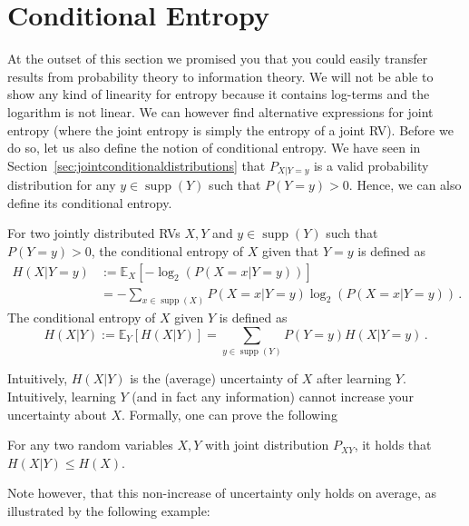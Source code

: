 \documentclass[11pt,leqno,a4paper]{report}\usepackage[]{graphicx}\usepackage[]{color}
\newcommand{\supp}{\operatorname{supp}}
\newcommand{\E}{\mathbb{E}}
\begin{document}
\section{Conditional Entropy}
At the outset of this section we promised you that you could easily transfer results from probability 
theory to information theory. We will not be able to show any kind of linearity for entropy because it contains
log-terms and the logarithm is not linear. We can however find alternative expressions for joint entropy (where 
the joint entropy is simply the entropy of a joint RV). Before we do so, let us also define the notion of 
conditional entropy. We have seen in Section~\ref{sec:jointconditionaldistributions} that $P_{X|Y=y}$ is a valid probability distribution for any $y \in \supp(Y)$ such that $P(Y=y)>0$. Hence, we can also define its conditional entropy.

\begin{Definition}
For two jointly distributed RVs $ X,Y $ and $y \in \supp(Y)$ such that $P(Y=y)>0$, the conditional entropy of $ X $ given that $ Y=y $ is defined as
\begin{align*}
H(X | Y=y) &:= \E_X[-\log_{2}(P(X=x | Y=y))] \\
&= - \!\! \sum_{x \in \supp(X)} P(X=x | Y=y) \log_2(P(X=x | Y=y))\, . 
\end{align*}
The conditional entropy of $X$ given $Y$ is defined as
$$ H(X | Y) := \E_Y[ H(X | Y) ] = \sum_{y \in \supp(Y)} P(Y=y) H(X | Y=y) \, .$$
\end{Definition}

Intuitively, $H(X | Y)$ is the (average) uncertainty of $X$ after learning $Y$. Intuitively, learning $Y$ (and in fact any information) cannot increase your uncertainty about $X$. Formally, one can prove the following 
\begin{Lemma} \label{lemma:noincrease}
For any two random variables $X,Y$ with joint distribution $P_{XY}$, it holds that $H(X | Y) \leq H(X)$.
\end{Lemma}
Note however, that this non-increase of uncertainty only holds on average, as illustrated by the following example:
\end{document}
